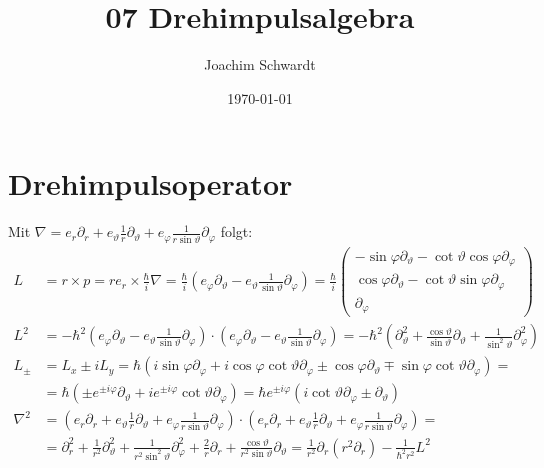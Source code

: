 \documentclass[a4paper,12pt]{article}
\newcommand{\kla}{}
\begin{document}
\title{07 Drehimpulsalgebra}
\author{Joachim Schwardt}
\date{\today}
\maketitle

\section{Drehimpulsoperator}
Mit $\nabla=e_r\partial_r+e_\vartheta\frac{1}{r}\partial_\vartheta+e_\varphi\frac{1}{r\sin\vartheta}\partial_\varphi$ folgt:
\begin{align*}
L&=r\times p=re_r\times\frac{\hbar}{i}\nabla=\frac{\hbar}{i}\kla\left( {e_\varphi\partial_\vartheta - e_\vartheta\frac{1}{\sin\vartheta}\partial_\varphi } \right)=\frac{\hbar}{i}\begin{pmatrix}
-\sin\varphi\partial_\vartheta - \cot\vartheta\cos\varphi\partial_\varphi \\ \cos\varphi\partial_\vartheta - \cot\vartheta\sin\varphi\partial_\varphi \\ \partial_\varphi
\end{pmatrix}\\
L^2&=-\hbar^2\kla\left( {e_\varphi\partial_\vartheta - e_\vartheta\frac{1}{\sin\vartheta}\partial_\varphi } \right)\cdot\kla\left( {e_\varphi\partial_\vartheta - e_\vartheta\frac{1}{\sin\vartheta}\partial_\varphi } \right)=-\hbar^2\kla\left( {\partial_\vartheta^2+\frac{\cos\vartheta}{\sin\vartheta}\partial_\vartheta+\frac{1}{\sin^2\vartheta}\partial_\varphi^2} \right) \\
L_\pm &=L_x\pm iL_y=\hbar\kla\left( {i\sin\varphi\partial_\varphi + i\cos\varphi\cot\vartheta\partial_\varphi\pm \cos\varphi\partial_\vartheta \mp \sin\varphi\cot\vartheta\partial_\varphi} \right)= \\
&=\hbar\kla\left( {\pm e^{\pm i\varphi}\partial_\vartheta +ie^{\pm i\varphi}\cot\vartheta\partial_\varphi} \right)=\hbar e^{\pm i\varphi}\kla\left( {i\cot\vartheta\partial_\varphi\pm\partial_\vartheta} \right) \\
\nabla^2&=\kla\left( {e_r\partial_r+e_\vartheta\frac{1}{r}\partial_\vartheta+e_\varphi\frac{1}{r\sin\vartheta}\partial_\varphi} \right)\cdot\kla\left( {e_r\partial_r+e_\vartheta\frac{1}{r}\partial_\vartheta+e_\varphi\frac{1}{r\sin\vartheta}\partial_\varphi} \right)=\\
&=\partial_r^2+\frac{1}{r^2}\partial_\vartheta^2+\frac{1}{r^2\sin^2\vartheta}\partial_\varphi^2+\frac{2}{r}\partial_r+\frac{\cos\vartheta}{r^2\sin\vartheta}\partial_\vartheta=\frac{1}{r^2}\partial_r\kla\left( {r^2\partial_r} \right)-\frac{1}{\hbar^2r^2}L^2
\end{align*}
\end{document}
